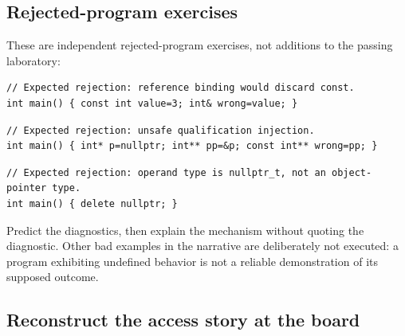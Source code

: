 \subsection{Rejected-program exercises}\label{05-engine-i-ch004-rejected-program-exercises}

\hypertarget{05-engine-i-ch004-rejected-program-exercises}{}

These are independent rejected-program exercises, not additions to the passing laboratory:

\begin{verbatim}
// Expected rejection: reference binding would discard const.
int main() { const int value=3; int& wrong=value; }
\end{verbatim}

\begin{verbatim}
// Expected rejection: unsafe qualification injection.
int main() { int* p=nullptr; int** pp=&p; const int** wrong=pp; }
\end{verbatim}

\begin{verbatim}
// Expected rejection: operand type is nullptr_t, not an object-pointer type.
int main() { delete nullptr; }
\end{verbatim}

Predict the diagnostics, then explain the mechanism without quoting the diagnostic. Other bad examples in the narrative are deliberately not executed: a program exhibiting undefined behavior is not a reliable demonstration of its supposed outcome.

\subsection{Reconstruct the access story at the board}\label{05-engine-i-ch004-reconstruct-the-access-story-at-the-board}

\hypertarget{05-engine-i-ch004-reconstruct-the-access-story-at-the-board}{}

